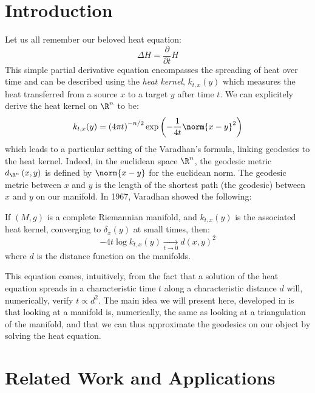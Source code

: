 \documentclass[math, info, english]{cours}
\begin{document}
\section{Introduction}
Let us all remember our beloved heat equation:
\begin{equation}
	\Delta H = \frac{\partial}{\partial t} H
\end{equation}
This simple partial derivative equation encompasses the spreading of heat over time and can be described using the \emph{heat kernel}, $k_{t, x}(y)$ which measures the heat transferred from a source $x$ to a target $y$ after time $t$.
We can explicitely derive the heat kernel on $\R^{n}$ to be:
\begin{equation}
	k_{t, x}(y) = \left( 4\pi t \right)^{-n/2}\exp\left( -\frac{1}{4t} \norm{x - y}^{2}\right)
\end{equation}
which leads to a particular setting of the Varadhan's formula, linking geodesics to the heat kernel.
Indeed, in the euclidean space $\R^{n}$, the geodesic metric $d_{\R^{n}}\left( x, y \right)$ is defined by $\norm{x - y}$ for the euclidean norm.
The geodesic metric between $x$ and $y$ is the length of the shortest path (the geodesic) between $x$ and $y$ on our manifold.
In 1967, Varadhan showed the following:
\begin{thm}
	If $(M, g)$ is a complete Riemannian manifold, and $k_{t, x}(y)$ is the associated heat kernel, converging to $\delta_{x}(y)$ at small times, then:
	\begin{equation}
		\tag{VF}
		-4t \log k_{t, x}(y) \xrightarrow[t \to 0]{} d\left( x, y \right)^{2}
		\label{varadhanformula}
	\end{equation}
	where $d$ is the distance function on the manifolds.
	\label{thm:varadhan}
\end{thm}
This equation comes, intuitively, from the fact that a solution of the heat equation spreads in a characteristic time $t$ along a characteristic distance $d$ will, numerically, verify $t \propto d^{2}$.
The main idea we will present here, developed in \cite{heatgeodesics} is that looking at a manifold is, numerically, the same as looking at a triangulation of the manifold, and that we can thus approximate the geodesics on our object by solving the heat equation.

\section{Related Work and Applications}
\end{document}
